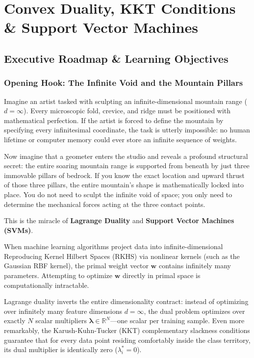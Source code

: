 \chapter[Convex Duality, KKT Conditions \& SVMs]{Convex Duality, KKT Conditions \& Support Vector Machines}
\label{chap:week10}

\section{Executive Roadmap \& Learning Objectives}

\subsection{Opening Hook: The Infinite Void and the Mountain Pillars}
Imagine an artist tasked with sculpting an infinite-dimensional mountain range ($d = \infty$). Every microscopic fold, crevice, and ridge must be positioned with mathematical perfection. If the artist is forced to define the mountain by specifying every infinitesimal coordinate, the task is utterly impossible: no human lifetime or computer memory could ever store an infinite sequence of weights.

Now imagine that a geometer enters the studio and reveals a profound structural secret: the entire soaring mountain range is supported from beneath by just three immovable pillars of bedrock. If you know the exact location and upward thrust of those three pillars, the entire mountain's shape is mathematically locked into place. You do not need to sculpt the infinite void of space; you only need to determine the mechanical forces acting at the three contact points.

This is the miracle of \textbf{Lagrange Duality} and \textbf{Support Vector Machines (SVMs)}. 

When machine learning algorithms project data into infinite-dimensional Reproducing Kernel Hilbert Spaces (RKHS) via nonlinear kernels (such as the Gaussian RBF kernel), the primal weight vector $\mathbf{w}$ contains infinitely many parameters. Attempting to optimize $\mathbf{w}$ directly in primal space is computationally intractable. 

Lagrange duality inverts the entire dimensionality contract: instead of optimizing over infinitely many feature dimensions $d = \infty$, the dual problem optimizes over exactly $N$ scalar multipliers $\boldsymbol{\lambda} \in \mathbb{R}^N$---one scalar per training sample. Even more remarkably, the Karush-Kuhn-Tucker (KKT) complementary slackness conditions guarantee that for every data point residing comfortably inside the class territory, its dual multiplier is identically zero ($\lambda_i^* = 0$). 

